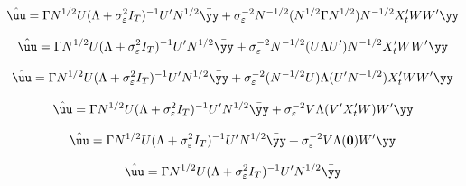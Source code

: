 \begin{equation}
    \hat{\uu} = 
   \Gamma 
    N^{1/2}U (\Lambda + \sigma_\varepsilon^2I_T)^{-1}U' N^{1/2} \bar{\yy}  + \sigma_\varepsilon^{-2}N^{-1/2}(N^{1/2}\Gamma N^{1/2}) N^{-1/2}
    X_t'W W'\yy
\end{equation}

\begin{equation}
    \hat{\uu} = 
   \Gamma 
    N^{1/2}U (\Lambda + \sigma_\varepsilon^2I_T)^{-1}U' N^{1/2} \bar{\yy}  + \sigma_\varepsilon^{-2}N^{-1/2}(U \Lambda U') N^{-1/2}
    X_t'W W'\yy
\end{equation}

\begin{equation}
    \hat{\uu} = 
   \Gamma 
    N^{1/2}U (\Lambda + \sigma_\varepsilon^2I_T)^{-1}U' N^{1/2} \bar{\yy}  + \sigma_\varepsilon^{-2}(N^{-1/2}U) \Lambda (U' N^{-1/2})
    X_t'W W'\yy
\end{equation}

\begin{equation}
    \hat{\uu} = 
   \Gamma 
    N^{1/2}U (\Lambda + \sigma_\varepsilon^2I_T)^{-1}U' N^{1/2} \bar{\yy}  + \sigma_\varepsilon^{-2}V \Lambda (V'
    X_t'W) W'\yy
\end{equation}

\begin{equation}
    \hat{\uu} = 
   \Gamma 
    N^{1/2}U (\Lambda + \sigma_\varepsilon^2I_T)^{-1}U' N^{1/2} \bar{\yy}  + \sigma_\varepsilon^{-2}V \Lambda (\mathbf{0}) W'\yy
\end{equation}

\begin{equation}
    \hat{\uu} = 
   \Gamma 
    N^{1/2}U (\Lambda + \sigma_\varepsilon^2I_T)^{-1}U' N^{1/2} \bar{\yy}  
\end{equation}
